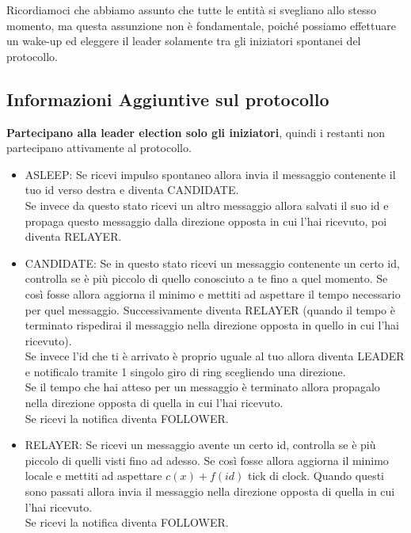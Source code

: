 Ricordiamoci che abbiamo assunto che tutte le entità si svegliano allo stesso
momento, ma questa assunzione non è fondamentale, poiché possiamo effettuare un
wake-up ed eleggere il leader solamente tra gli iniziatori spontanei del
protocollo.

\subsection{Informazioni Aggiuntive sul protocollo}
\textbf{Partecipano alla leader election solo gli iniziatori}, quindi i restanti
non partecipano attivamente al protocollo.

\begin{itemize}
    \item ASLEEP: Se ricevi impulso spontaneo allora invia il messaggio contenente
          il tuo id verso destra e diventa CANDIDATE.\\
          Se invece da questo stato ricevi un altro messaggio allora salvati il
          suo id e propaga questo messaggio dalla direzione opposta in cui l'hai
          ricevuto, poi diventa RELAYER.
    \item CANDIDATE: Se in questo stato ricevi un messaggio contenente un certo
          id, controlla se è più piccolo di quello conosciuto a te fino a quel momento.
          Se così fosse allora aggiorna il minimo e mettiti ad aspettare il tempo
          necessario per quel messaggio. Successivamente diventa RELAYER (quando il
          tempo è terminato rispedirai il messaggio nella direzione opposta in quello in
          cui l'hai ricevuto).\\
          Se invece l'id che ti è arrivato è proprio uguale al tuo allora diventa
          LEADER e notificalo tramite 1 singolo giro di ring scegliendo una
          direzione.\\
          Se il tempo che hai atteso per un messaggio è terminato allora propagalo
          nella direzione opposta di quella in cui l'hai ricevuto.\\
          Se ricevi la notifica diventa FOLLOWER.
    \item RELAYER: Se ricevi un messaggio avente un certo id, controlla se è più
          piccolo di quelli visti fino ad adesso. Se così fosse allora aggiorna il
          minimo locale e mettiti ad aspettare $c(x)+f(id)$ tick di clock. Quando questi
          sono passati allora invia il messaggio nella direzione opposta di quella in
          cui l'hai ricevuto.\\
          Se ricevi la notifica diventa FOLLOWER.

\end{itemize}

